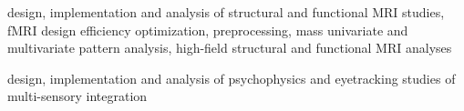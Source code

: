  design, implementation and analysis of structural and functional MRI studies, fMRI design efficiency optimization, preprocessing, mass univariate and multivariate pattern analysis, high-field structural and functional MRI analyses

 design, implementation and analysis of psychophysics and eyetracking studies of multi-sensory integration








